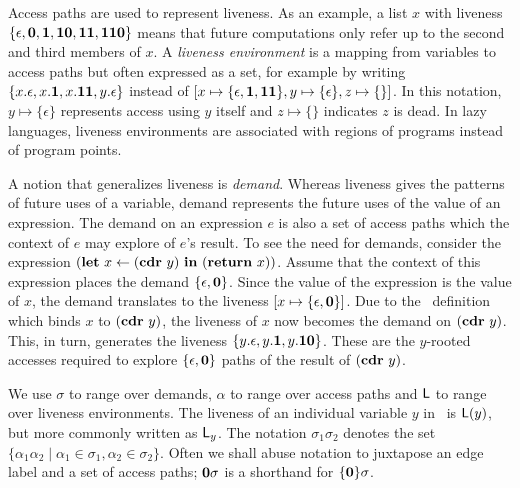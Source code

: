 \documentclass[9pt,nonatbib]{sigplanconf}
\begin{document}
Access paths are used to  represent liveness. As an example, a list
$x$ with 
liveness  $\{\epsilon,  \mathbf{0},  \mathbf{1},  \mathbf{1}\mathbf{0},
\mathbf{1}\mathbf{1},  \mathbf{1}\mathbf{1}\mathbf{0}\}$ means that future computations    only
refer up  to the  second and  third members of  $x$.  A  {\em liveness
  environment} is a mapping from  variables to access paths but often
expressed as  a set,  for example  by writing  $\{x.\epsilon, x.\mathbf{1},
x.\mathbf{1}\mathbf{1},        y.\epsilon\}$        instead        of        $[x
  \mapsto\{\epsilon,\mathbf{1},\mathbf{1}\mathbf{1}\},          y\mapsto\{\epsilon\},
  z\mapsto\{\}]$.    In  this   notation,  $y   \mapsto  \{\epsilon\}$
represents access using $y$ itself and $z \mapsto \{\}$ indicates 
$z$ is dead.  In lazy  languages, liveness environments are associated
with regions of programs instead of program points.

A notion  that generalizes liveness  is {\em demand}.   Whereas liveness
gives the patterns of future uses of a variable, demand represents the
future uses of the value of an expression.  The demand on an expression
$e$   is   also   a   set    of   access   paths
which the  context of $e$ may  explore of $e$'s
result.   To see  the need  for demands,  consider the expression
$(\mbox{$\mathbf{ let}$}~x\leftarrow  (\mbox{$\mathbf{cdr}$}~y)~\mbox{$\mathbf{ in}$}~   (\mbox{$\mathbf{ return}$}~x))$.   Assume   that  the
context of this expression places  the demand $\lbrace \epsilon, \mathbf{0}
\rbrace$. Since the  value of the expression is the  value of $x$, the
demand translates to the liveness  $[x \mapsto \lbrace \epsilon, \mathbf{0}
  \rbrace]$.   Due  to  the  \LET\   definition  which  binds  $x$  to
$(\mbox{$\mathbf{cdr}$}~y)$, the liveness of $x$  now becomes the demand on $(\mbox{$\mathbf{cdr}$}~y)$.
This, in  turn, generates  the liveness $\lbrace  y.\epsilon, y.\mathbf{1},
y.\mathbf{1}\mathbf{0}  \rbrace$.   These are  the $y$-rooted  accesses
required to  explore $\lbrace  \epsilon, \mathbf{0}  \rbrace$ paths  of the
result of $(\mbox{$\mathbf{cdr}$}~y)$.
  
We use $\sigma$  to range over demands, $\alpha$ to  range over access
paths and $\mathsf{L}$  to range over liveness environments.  The liveness of
an  individual variable  $y$ in  \Lv\  is $\mathsf{L}(y)$,  but more  commonly
written as  $\mathsf{L}_y$.  The notation $\sigma_1\sigma_2$  denotes the set
$\lbrace  \alpha_1\alpha_2 \mid  \alpha_1 \in  \sigma_1, \alpha_2  \in
\sigma_2\rbrace$.  Often we shall abuse  notation to juxtapose an edge
label and  a set  of access  paths; $\mathbf{0}\sigma$  is a  shorthand for
$\lbrace\mathbf{0}\rbrace\sigma$.
\end{document}
